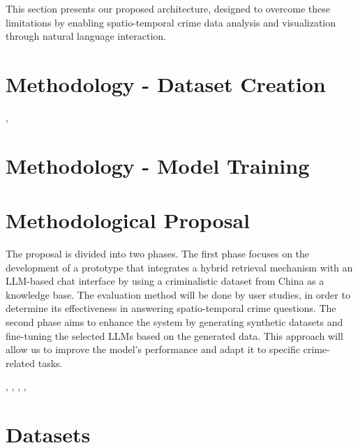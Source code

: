 This section presents our proposed architecture, designed to overcome these limitations by enabling spatio-temporal crime data analysis and visualization through natural language interaction.


\section{Methodology - Dataset Creation}

\cite{Holtzman2020NucleusSampling}, \cite{Yin2024MuMathCode}

\section{Methodology - Model Training}

\cite{Qwen2025Qwen2.5}

\section{Methodological Proposal}

The proposal is divided into two phases. The first phase focuses on the development of a prototype that integrates a hybrid retrieval mechanism with an LLM-based chat interface by using a criminalistic dataset from China as a knowledge base. The evaluation method will be done by user studies, in order to determine its effectiveness in answering spatio-temporal crime questions. The second phase aims to enhance the system by generating synthetic datasets and fine-tuning the selected LLMs based on the generated data. This approach will allow us to improve the model's performance and adapt it to specific crime-related tasks.

\cite{Moshkov2025AIMO2}, \cite{Fleureau2024NuminaMath}, \cite{Jain2024MetaFineTuning}, \cite{Wang2023SelfConsistency}, \cite{Ahmad2025OCRNVidia}

\section{Datasets}

